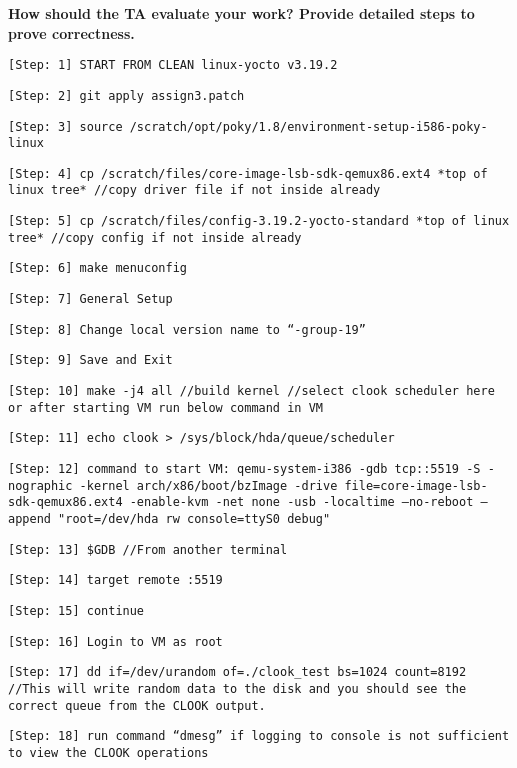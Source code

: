 \documentclass[10pt,letterpaper,draftclsnofoot,onecolumn]{IEEEtran}
\begin{document}
\noindent\textbf{How should the TA evaluate your work? Provide detailed steps to prove correctness.}
\begin{description}
\item \texttt{[Step: 1] START FROM CLEAN linux-yocto v3.19.2}
\item \texttt{[Step: 2] git apply assign3.patch}
\item \texttt{[Step: 3] source /scratch/opt/poky/1.8/environment-setup-i586-poky-linux}
\item \texttt{[Step: 4] cp /scratch/files/core-image-lsb-sdk-qemux86.ext4 *top of linux tree* \newline //copy driver file if not inside already}
\item \texttt{[Step: 5] cp /scratch/files/config-3.19.2-yocto-standard *top of linux tree* \newline//copy config if not inside already}
\item \texttt{[Step: 6] make menuconfig}
\item \texttt{[Step: 7] General Setup}
\item \texttt{[Step: 8] Change local version name to “-group-19”}
\item \texttt{[Step: 9] Save and Exit}
\item \texttt{[Step: 10] make -j4 all \newline //build kernel \newline //select clook scheduler here or after starting VM run below command in VM}
\item \texttt{[Step: 11] echo clook > /sys/block/hda/queue/scheduler}
\item \texttt{[Step: 12] command to start VM: \newline qemu-system-i386 -gdb tcp::5519 -S -nographic -kernel arch/x86/boot/bzImage -drive file=core-image-lsb-sdk-qemux86.ext4 -enable-kvm -net none -usb -localtime --no-reboot --append "root=/dev/hda rw console=ttyS0 debug"}
\item \texttt{[Step: 13] \$GDB \newline //From another terminal}
\item \texttt{[Step: 14] target remote :5519}
\item \texttt{[Step: 15] continue}
\item \texttt{[Step: 16] Login to VM as root}
\item \texttt{[Step: 17] dd if=/dev/urandom of=./clook\_test bs=1024 count=8192 \newline //This will write random data to the disk and you should see the correct queue from the CLOOK output.} 
\item \texttt{[Step: 18] run command “dmesg” if logging to console is not sufficient to view the CLOOK operations}

\end{description}



\end{document}
